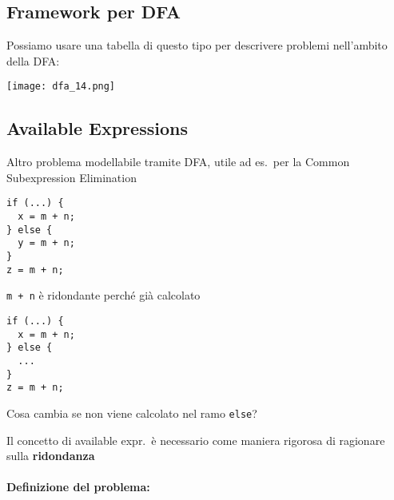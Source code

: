 \subsection{Framework per DFA}

Possiamo usare una tabella di questo tipo per descrivere problemi nell'ambito della DFA:

\begin{center}
  \texttt{[image: dfa\_14.png]}
\end{center}

\subsection{Available Expressions}

Altro problema modellabile tramite DFA, utile ad es.~per la Common Subexpression Elimination

\begin{center}
  \begin{minipage}[c]{.4\textwidth}
    \begin{lstlisting}[linewidth=.6\linewidth]
if (...) {
  x = m + n;
} else {
  y = m + n;
}
z = m + n;\end{lstlisting}
  \lstinline|m + n| \`e ridondante perch\'e gi\`a calcolato
\end{minipage}\quad
\begin{minipage}[c]{.5\textwidth}
    \begin{lstlisting}[linewidth=.48\linewidth]
if (...) {
  x = m + n;
} else {
  ...
}
z = m + n;\end{lstlisting}
Cosa cambia se non viene calcolato nel ramo \lstinline|else|?
\end{minipage}
\end{center}

Il concetto di available expr.~\`e necessario come maniera rigorosa di ragionare sulla \textbf{ridondanza}

\paragraph{Definizione del problema:}

